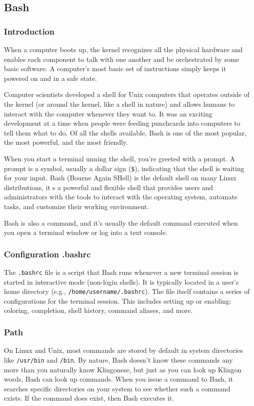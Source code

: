 \documentclass{article}
\begin{document}
\subsection{Bash}

\subsubsection{Introduction}
When a computer boots up, the kernel recognizes all the physical hardware and enables each component to talk with one another and be orchestrated by some basic software. A computer's most basic set of instructions simply keeps it powered on and in a safe state.

Computer scientists developed a shell for Unix computers that operates outside of the kernel (or around the kernel, like a shell in nature) and allows humans to interact with the computer whenever they want to. It was an exciting development at a time when people were feeding punchcards into computers to tell them what to do. Of all the shells available, Bash is one of the most popular, the most powerful, and the most friendly.

When you start a terminal unning the shell, you're greeted with a prompt. A prompt is a symbol, usually a dollar sign (\verb|$|), indicating that the shell is waiting for your input. 
Bash (Bourne Again SHell) is the default shell on many Linux distributions, it s a powerful and flexible shell that provides users and administrators with the tools to interact with the operating system, automate tasks, and customize their working environment.

Bash is also a command, and it's usually the default command executed when you open a terminal window or log into a text console.

\subsubsection{Configuration .bashrc}
The \verb|.bashrc| file is a script that Bash runs whenever a new terminal session is started in interactive mode (non-login shells). It is typically located in a user's home directory (e.g., \verb|/home/username/.bashrc|).
The file itself contains a series of configurations for the terminal session. This includes setting up or enabling: coloring, completion, shell history, command aliases, and more.

\subsubsection{Path}
On Linux and Unix, most commands are stored by default in system directories like \verb|/usr/bin| and \verb|/bin|. By nature, Bash doesn't know these commands any more than you naturally know Klingonese, but just as you can look up Klingon words, Bash can look up commands. When you issue a command to Bash, it searches specific directories on your system to see whether such a command exists. If the command does exist, then Bash executes it.
\end{document}
